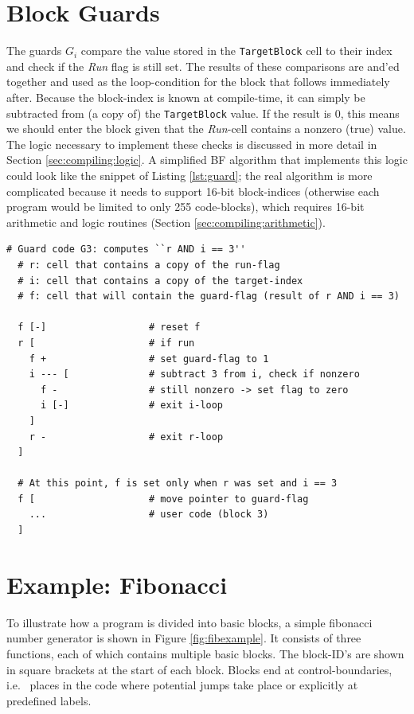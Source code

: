 \section{Block Guards}
The guards $G_i$ compare the value stored in the \texttt{TargetBlock} cell to their index and check if the \emph{Run} flag is still set. The results of these comparisons are and'ed together and used as the loop-condition for the block that follows immediately after. Because the block-index is known at compile-time, it can simply be subtracted from (a copy of) the \texttt{TargetBlock} value. If the result is 0, this means we should enter the block given that the \emph{Run}-cell contains a nonzero (true) value. The logic necessary to implement these checks is discussed in more detail in Section \ref{sec:compiling:logic}. A simplified BF algorithm that implements this logic could look like the snippet of Listing \ref{lst:guard}; the real algorithm is more complicated because it needs to support 16-bit block-indices (otherwise each program would be limited to only 255 code-blocks), which requires 16-bit arithmetic and logic routines (Section \ref{sec:compiling:arithmetic}).

\begin{lstfloat}[H]
\begin{lstlisting}[style=brainfuck]
  # Guard code G3: computes ``r AND i == 3''
  # r: cell that contains a copy of the run-flag
  # i: cell that contains a copy of the target-index
  # f: cell that will contain the guard-flag (result of r AND i == 3)

  f [-]                  # reset f
  r [                    # if run
    f +                  # set guard-flag to 1
    i --- [              # subtract 3 from i, check if nonzero
      f -                # still nonzero -> set flag to zero
      i [-]              # exit i-loop
    ]
    r -                  # exit r-loop
  ]

  # At this point, f is set only when r was set and i == 3  
  f [                    # move pointer to guard-flag
    ...                  # user code (block 3)
  ]

\end{lstlisting}
\caption{Simplified guard code for block 3 ($G_3$). The contents of block 3 will be executed only if \texttt{f} is nonzero.}
\label{lst:bfadd}
\end{lstfloat}




\section{Example: Fibonacci}
To illustrate how a program is divided into basic blocks, a simple fibonacci number generator is shown in Figure \ref{fig:fibexample}. It consists of three functions, each of which contains multiple basic blocks. The block-ID's are shown in square brackets at the start of each block. Blocks end at control-boundaries, i.e.~ places in the code where potential jumps take place or explicitly at predefined labels.

